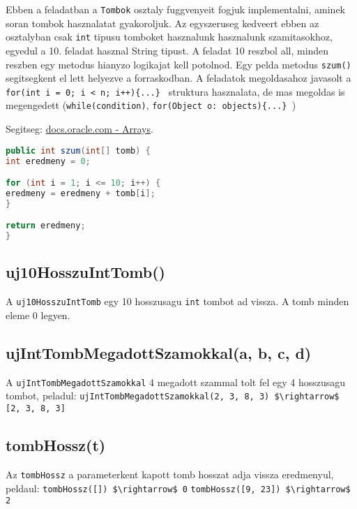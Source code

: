 \documentclass{article}
\begin{document}
Ebben a feladatban a \lstinline{Tombok} osztaly fuggvenyeit fogjuk implementalni, aminek soran tombok hasznalatat gyakoroljuk. Az egyszeruseg kedveert ebben az osztalyban csak \lstinline{int} tipusu tomboket hasznalunk hasznalunk szamitasokhoz, egyedul a 10. feladat hasznal String tipust. A feladat 10 reszbol all, minden reszben egy metodus hianyzo logikajat kell potolnod. Egy pelda metodus \lstinline{szum()} segitsegkent el lett helyezve a forraskodban. A feladatok megoldasahoz javasolt a \lstinline|for(int i = 0; i < n; i++){...} | struktura hasznalata, de mas megoldas is megengedett (\lstinline{while(condition)}, \newline \lstinline|for(Object o: objects){...} |)

Segitseg: \href{https://docs.oracle.com/javase/tutorial/java/nutsandbolts/arrays.html}{docs.oracle.com - Arrays}.

\begin{lstlisting}[language=Java, caption=Pelda Metodus]
public int szum(int[] tomb) {
int eredmeny = 0;

for (int i = 1; i <= 10; i++) {
eredmeny = eredmeny + tomb[i];
}

return eredmeny;
}
\end{lstlisting}

\subsection{uj10HosszuIntTomb()}
A \lstinline{uj10HosszuIntTomb} egy 10 hosszusagu \lstinline{int} tombot ad vissza. A tomb minden eleme 0 legyen.\newline

\subsection{ujIntTombMegadottSzamokkal(a, b, c, d)}
A \lstinline{ujIntTombMegadottSzamokkal} 4 megadott szammal tolt fel egy 4 hosszusagu tombot, peladul:\newline
\lstinline[mathescape]{ujIntTombMegadottSzamokkal(2, 3, 8, 3) $\rightarrow$ [2, 3, 8, 3]}\newline

\subsection{tombHossz(t)}
Az \lstinline{tombHossz} a parameterkent kapott tomb hosszat adja vissza eredmenyul, peldaul:\newline
\lstinline[mathescape]{tombHossz([]) $\rightarrow$ 0}\newline
\lstinline[mathescape]{tombHossz([9, 23]) $\rightarrow$ 2}\newline
\end{document}
